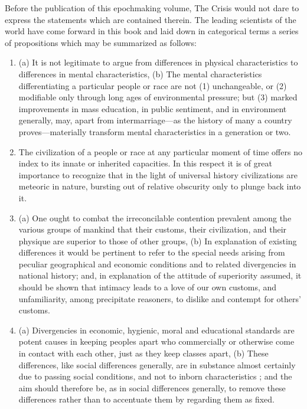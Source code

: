 \documentclass[letterpaper,10pt,english]{jupyterBook}
\begin{document}
\sphinxAtStartPar
Before the publication of this epoch\sphinxhyphen{}making volume, The Crisis would not dare to express the statements which are contained therein. The leading scientists of the world have come forward in this book and laid down in categorical terms a series of proposi­tions which may be summarized as follows:
\begin{enumerate}
%
\item {} 
\sphinxAtStartPar
(a) It is not legitimate to argue from differences in physical characteristics to differences in mental characteristics, (b) The mental characteristics differentiating a particular people or race are not (1) unchangeable, or (2) modifiable only through long ages of environmental pressure; but (3) marked improvements in mass education, in public sentiment, and in environment generally, may, apart from intermarriage—as the history of many a country proves—materially transform mental characteristics in a generation or two.

\item {} 
\sphinxAtStartPar
The civilization of a people or race at any particular moment of time offers no index to its innate or inherited capacities. In this respect it is of great importance to recognize that in the light of universal history civilizations are meteoric in nature, bursting out of relative obscurity only to plunge back into it.

\item {} 
\sphinxAtStartPar
(a) One ought to combat the irreconcilable contention prevalent among the various groups of mankind that their customs, their civilization, and their physique are superior to those of other groups, (b) In explanation of existing differences it would be pertinent to refer to the special needs arising from peculiar geographical and economic conditions and to related divergencies in national history; and, in explanation of the attitude of superiority assumed, it should be shown that intimacy leads to a love of our own customs, and unfamiliarity, among precipitate reasoners, to dislike and contempt for others’ customs.

\item {} 
\sphinxAtStartPar
(a) Divergencies in economic, hygienic, moral and educational standards are potent causes in keeping peoples apart who commercially or otherwise come in contact with each other, just as they keep classes apart, (b) These differences, like social differences generally, are in substance almost certainly due to passing social conditions, and not to inborn characteristics ; and the aim should therefore be, as in social differences generally, to remove these differences rather than to accentuate them by regarding them as fixed.


\end{enumerate}
\end{document}
